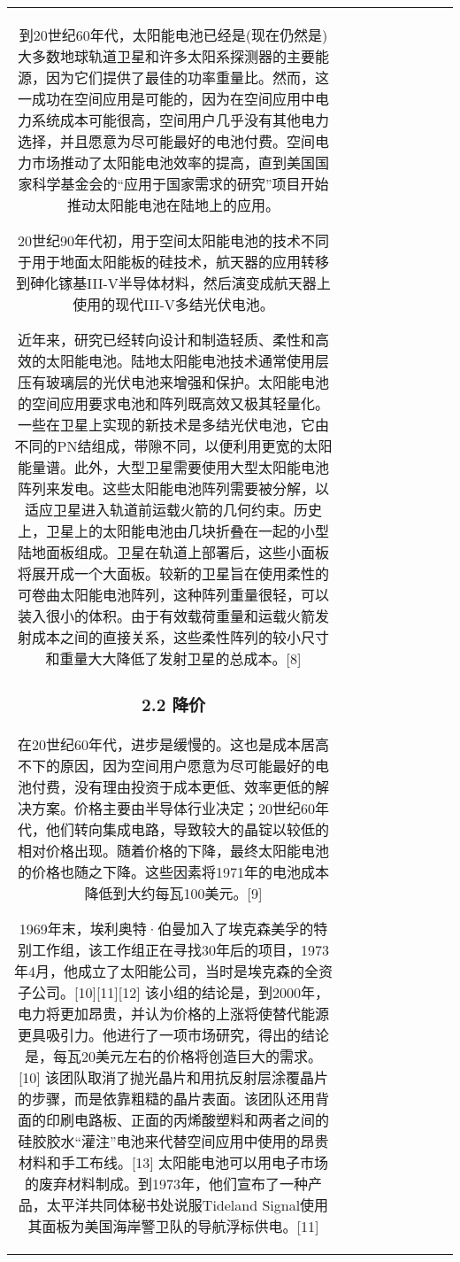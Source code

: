 \begin{table}[ht]
\begin{tabular}{|c|c|c|c|c|c|c|c|c}
到20世纪60年代，太阳能电池已经是(现在仍然是)大多数地球轨道卫星和许多太阳系探测器的主要能源，因为它们提供了最佳的功率重量比。然而，这一成功在空间应用是可能的，因为在空间应用中电力系统成本可能很高，空间用户几乎没有其他电力选择，并且愿意为尽可能最好的电池付费。空间电力市场推动了太阳能电池效率的提高，直到美国国家科学基金会的“应用于国家需求的研究”项目开始推动太阳能电池在陆地上的应用。

20世纪90年代初，用于空间太阳能电池的技术不同于用于地面太阳能板的硅技术，航天器的应用转移到砷化镓基III-V半导体材料，然后演变成航天器上使用的现代III-V多结光伏电池。

近年来，研究已经转向设计和制造轻质、柔性和高效的太阳能电池。陆地太阳能电池技术通常使用层压有玻璃层的光伏电池来增强和保护。太阳能电池的空间应用要求电池和阵列既高效又极其轻量化。一些在卫星上实现的新技术是多结光伏电池，它由不同的PN结组成，带隙不同，以便利用更宽的太阳能量谱。此外，大型卫星需要使用大型太阳能电池阵列来发电。这些太阳能电池阵列需要被分解，以适应卫星进入轨道前运载火箭的几何约束。历史上，卫星上的太阳能电池由几块折叠在一起的小型陆地面板组成。卫星在轨道上部署后，这些小面板将展开成一个大面板。较新的卫星旨在使用柔性的可卷曲太阳能电池阵列，这种阵列重量很轻，可以装入很小的体积。由于有效载荷重量和运载火箭发射成本之间的直接关系，这些柔性阵列的较小尺寸和重量大大降低了发射卫星的总成本。[8]

\subsubsection{2.2 降价}

在20世纪60年代，进步是缓慢的。这也是成本居高不下的原因，因为空间用户愿意为尽可能最好的电池付费，没有理由投资于成本更低、效率更低的解决方案。价格主要由半导体行业决定；20世纪60年代，他们转向集成电路，导致较大的晶锭以较低的相对价格出现。随着价格的下降，最终太阳能电池的价格也随之下降。这些因素将1971年的电池成本降低到大约每瓦100美元。[9]

1969年末，埃利奥特·伯曼加入了埃克森美孚的特别工作组，该工作组正在寻找30年后的项目，1973年4月，他成立了太阳能公司，当时是埃克森的全资子公司。[10][11][12] 该小组的结论是，到2000年，电力将更加昂贵，并认为价格的上涨将使替代能源更具吸引力。他进行了一项市场研究，得出的结论是，每瓦20美元左右的价格将创造巨大的需求。[10] 该团队取消了抛光晶片和用抗反射层涂覆晶片的步骤，而是依靠粗糙的晶片表面。该团队还用背面的印刷电路板、正面的丙烯酸塑料和两者之间的硅胶胶水“灌注”电池来代替空间应用中使用的昂贵材料和手工布线。[13] 太阳能电池可以用电子市场的废弃材料制成。到1973年，他们宣布了一种产品，太平洋共同体秘书处说服Tideland Signal使用其面板为美国海岸警卫队的导航浮标供电。[11]


\end{tabular}
\end{table}
